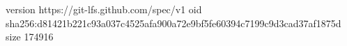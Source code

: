 version https://git-lfs.github.com/spec/v1
oid sha256:d81421b221c93a037c4525afa900a72e9bf5fe60394c7199c9d3cad37af1875d
size 174916
